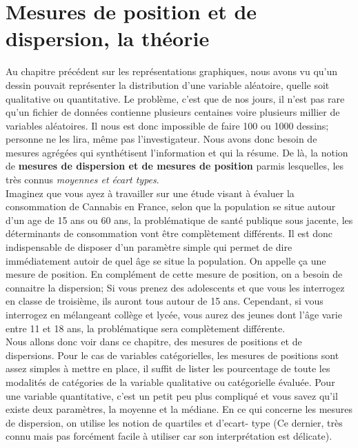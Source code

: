 \section{Mesures de position et de dispersion, la théorie}
Au chapitre précédent sur les représentations graphiques, nous avons vu qu'un dessin pouvait représenter la distribution d'une variable aléatoire, quelle soit qualitative ou quantitative.\newline
Le problème, c'est que de nos jours, il n'est pas rare qu'un fichier de données contienne plusieurs centaines voire plusieurs millier de variables aléatoires. Il nous est donc impossible de faire 100 ou 1000 dessins; personne ne les lira, même pas l'investigateur.\newline
Nous avons donc besoin de mesures agrégées qui synthétisent l'information et qui la résume. De là, la notion de \textbf{mesures de dispersion et de mesures de position} parmis lesquelles, les très connus \textit{moyennes et écart types}.\newline
\\
Imaginez que vous ayez à travailler sur une étude visant à évaluer la consommation de Cannabis en France, selon que la population se situe autour d'un age de 15 ans ou 60 ans, la problématique de santé publique sous jacente, les déterminants de consommation vont être complètement différents. Il est donc indispensable de disposer d'un paramètre simple qui permet de dire immédiatement autoir de quel âge se situe la population. On appelle ça une mesure de position.\newline
En complément de cette mesure de position, on a besoin de connaitre la dispersion; Si vous prenez des adolescents et que vous les interrogez en classe de troisième, ils auront tous autour de 15 ans. Cependant, si vous interrogez en mélangeant collège et lycée, vous aurez des jeunes dont l'âge varie entre 11 et 18 ans, la problématique sera complètement différente.\newline
\\
Nous allons donc voir dans ce chapitre, des mesures de positions et de dispersions. Pour le cas de variables catégorielles, les mesures de positions sont assez simples à mettre en place, il suffit de lister les pourcentage de toute les modalités de catégories de la variable qualitative ou catégorielle évaluée.\newline
Pour une variable quantitative, c'est un petit peu plus compliqué et vous savez qu'il existe deux paramètres, la moyenne et la médiane.\newline
En ce qui concerne les mesures de dispersion, on utilise les notion de quartiles et d'ecart- type (Ce dernier, très connu mais pas forcément facile à utiliser car son interprétation est délicate). 
